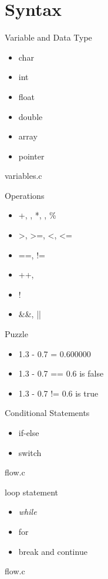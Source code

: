 \documentclass[UTF8]{beamer}
\begin{document}
\section{Syntax}
\begin{frame}[t]{Variable and Data Type}
    \begin{itemize}
        \item char
        \item int
        \item float
        \item double
        \item array
        \item pointer
    \end{itemize}
    variables.c
\end{frame}

\begin{frame}[t]{Operations}
    \begin{itemize}
        \item +, \-, *, \/, \%
        \item >, >=, <, <=
        \item ==, !=
        \item ++, \-\-
        \item !
        \item \&\&, ||
    \end{itemize}
\end{frame}

\begin{frame}[t]{Puzzle}
    \begin{itemize}
        \item 1.3 - 0.7 = 0.600000
        \item 1.3 - 0.7 == 0.6 is false
        \item 1.3 - 0.7 != 0.6 is true
    \end{itemize}
\end{frame}

\begin{frame}[t]{Conditional Statements}
    \begin{itemize}
        \item if-else
        \item switch
    \end{itemize}
    flow.c
\end{frame}

\begin{frame}[t]{loop statement}
    \begin{itemize}
        \item \textit{while}
        \item for
        \item break and continue
    \end{itemize}
    flow.c
\end{frame}
\end{document}
